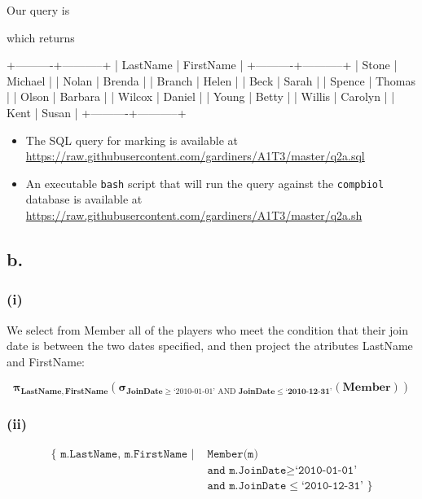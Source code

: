 \documentclass{article}
\newcommand{\select}[1]{
\boldsymbol{\sigma}_{#1}
}
\newcommand{\project}[1]{
\boldsymbol{\pi}_{#1}
}
\begin{document}
Our query is


which returns

\begin{bashinline}
+----------+-----------+
| LastName | FirstName |
+----------+-----------+
| Stone    | Michael   |
| Nolan    | Brenda    |
| Branch   | Helen     |
| Beck     | Sarah     |
| Spence   | Thomas    |
| Olson    | Barbara   |
| Wilcox   | Daniel    |
| Young    | Betty     |
| Willis   | Carolyn   |
| Kent     | Susan     |
+----------+-----------+
\end{bashinline}


\begin{itemize}
    \item The SQL query for marking is available at \url{https://raw.githubusercontent.com/gardiners/A1T3/master/q2a.sql}
    \item An executable \texttt{bash} script that will run the query against the \texttt{compbiol} database is available at \url{https://raw.githubusercontent.com/gardiners/A1T3/master/q2a.sh}
\end{itemize}

\subsection{b.}

\subsubsection{(i)}

We select from Member all of the players who meet the condition that their join date is between the two dates specified, and then project the atributes LastName and FirstName:

$$
\project{\mathbf{LastName, FirstName}}
\left(
\select{\mathbf{JoinDate} \geq \text{`2010-01-01' AND } \mathbf{JoinDate \leq \text{`2010-12-31'}}}
\left(\mathbf{Member}\right)
\right)
$$

\subsubsection{(ii)}

$$
\begin{aligned}
\{
\texttt{ m.LastName, m.FirstName } | &\texttt{ Member(m)} \\
    &\texttt{ and m.JoinDate} \geq \texttt{`2010-01-01'} \\
    &\texttt{ and m.JoinDate} \leq \texttt{`2010-12-31' }
\}
\end{aligned}
$$
\end{document}
